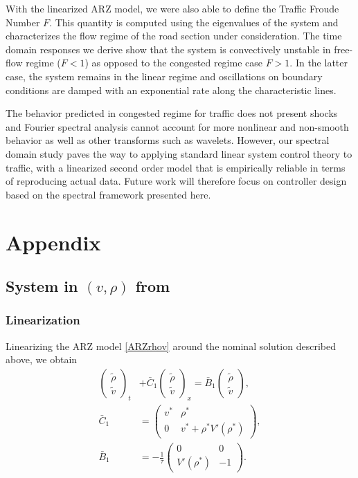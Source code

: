 \documentclass[a4paper, 10pt, conference]{ieeeconf}      %
\begin{document}
With the linearized ARZ model, we were also able to define the Traffic Froude Number $F$. This quantity is computed using the eigenvalues of the system and characterizes the flow regime of the road section under consideration. The time domain responses we derive show that the system is convectively unstable in free-flow regime ($F < 1$) as opposed to the congested regime case $F>1$. In the latter case, the system remains in the linear regime and oscillations on boundary conditions are damped with an exponential rate along the characteristic lines.

The behavior predicted in congested regime for traffic does not present shocks and Fourier spectral analysis cannot account for more nonlinear and non-smooth behavior as well as other transforms such as wavelets. However, our spectral domain study paves the way to applying standard linear system control theory to traffic, with a linearized second order model that is empirically reliable in terms of reproducing actual data. Future work will therefore focus on controller design based on the spectral framework presented here.



\newpage
\section*{Appendix}

\subsection{System in $(v, \rho)$ from}

\subsubsection{Linearization}
Linearizing the ARZ model \eqref{ARZrhov} around the nominal solution described above, we obtain
\begin{subequations} \label{rhovlin}
\begin{align}
\begin{pmatrix}
	\tilde{\rho} \\
	\tilde{v}
\end{pmatrix}_t
&+ \bar{C}_1
\begin{pmatrix}
	\tilde{\rho} \\ 
	\tilde{v}
\end{pmatrix}_x 
= 
\bar{B}_1
\begin{pmatrix}
	\tilde{\rho} \\
	\tilde{v}
\end{pmatrix}, \\
\bar{C}_1
&= 
\begin{pmatrix}
	v^* & \rho^* \\
	0 & v^* + \rho^* V' ( \rho^*) 
\end{pmatrix}, \\
\bar{B}_1 
&= 
-\frac{1}{\tau}
\begin{pmatrix}
	0 & 0 \\
	V'\left( \rho^{*} \right) & -1
\end{pmatrix}.
\end{align}
\end{subequations}
\end{document}
